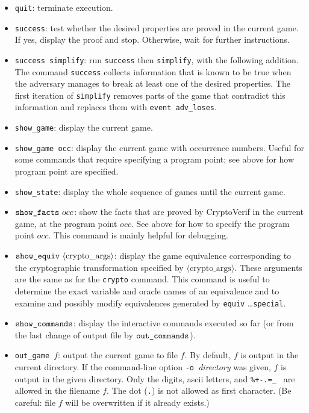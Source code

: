 \documentclass{article}
\newcommand{\nonterm}[1]{\langle\textrm{#1}\rangle}
\begin{document}
\begin{itemize}
\item \texttt{quit}: terminate execution.

\item \texttt{success}: test whether the desired properties are
proved in the current game. If yes, display the proof and stop.
Otherwise, wait for further instructions.

\item \texttt{success simplify}: run \texttt{success} then \texttt{simplify}, with the following addition. The command \texttt{success} collects information that is known to be true when the adversary manages to break at least one of the desired properties. The first iteration of \texttt{simplify} removes parts of the game that contradict this information and replaces them with \texttt{event adv\_loses}.

\item \texttt{show\string_game}: display the current game.

\item \texttt{show\string_game occ}: display the current game with
  occurrence numbers. Useful for some commands that require specifying a
  program point; see above for how program point are specified.

\item \texttt{show\string_state}: display the whole sequence
of games until the current game.

\item $\texttt{show\string_facts}\ occ$: show the facts that are proved
by CryptoVerif in the current game, at the program point $occ$. 
See above for how to specify the program point $occ$.
This command is mainly helpful for debugging.

\item $\texttt{show\string_equiv}\ \nonterm{crypto\_args}$: display the
game equivalence corresponding to the cryptographic transformation
specified by $\nonterm{crypto\_args}$. These arguments are the same as
for the \texttt{crypto} command.
This command is useful to determine the exact variable and oracle
names of an equivalence and to examine and possibly modify equivalences
generated by \texttt{equiv} \dots \texttt{special}.

\item $\texttt{show\string_commands}$: display the interactive commands
  executed so far (or from the last change of output file by
  $\texttt{out\string_commands}$). 

\item \texttt{out\string_game $f$}: output the current game to file $f$.
  By default, $f$ is output in the current directory. If the command-line
  option \texttt{-o }\textit{directory} was given, $f$ is output in the given
  directory. Only the digits, ascii letters, and \texttt{\%+-.=\string@\_\string~}
  are allowed in the filename $f$. The dot (\texttt{.}) is not allowed as first
  character.
  (Be careful: file $f$ will be overwritten if it already exists.)


\end{itemize}
\end{document}

